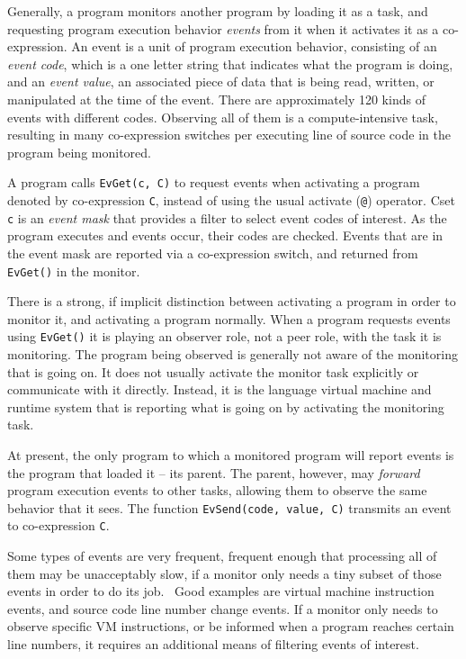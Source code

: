 Generally, a program monitors another program by loading it as a task,
and requesting program execution behavior \textit{events} from it when
it activates it as a co-expression. An event is a unit of program
execution behavior, consisting of an \textit{event code}, which is a
one letter string that indicates what the program is doing, and an
\textit{event value}, an associated piece of data that is being read,
written, or manipulated at the time of the event. There are
approximately 120 kinds of events with different codes. Observing all
of them is a compute-intensive task, resulting in many co-expression
switches per executing line of source code in the program being
monitored.

A program calls \texttt{EvGet(c, C)} to request events when activating a
program denoted by co-expression \texttt{C}, instead of using the usual
activate (\texttt{@}) operator. Cset \texttt{c} is an \textit{event
mask} that provides a filter to select event codes of interest. As
the program executes and events occur, their codes are checked.
Events that are in the event mask are reported via a co-expression switch,
and returned from \texttt{EvGet()} in the monitor.

There is a strong, if implicit distinction between activating a program
in order to monitor it, and activating a program normally. When a
program requests events using \texttt{EvGet()} it is playing an
observer role, not a peer role, with the task it is monitoring. The
program being observed is generally not aware of the monitoring that is
going on. It does not usually activate the monitor task explicitly or
communicate with it directly. Instead, it is the language virtual
machine and runtime system that is reporting what is going on by
activating the monitoring task.

At present, the only program to which a monitored program will report
events is the program that loaded it -- its parent. The parent,
however, may \textit{forward} program execution events to other tasks,
allowing them to observe the same behavior that it sees. The function
\texttt{EvSend(code, value, C)} transmits an event to co-expression
\texttt{C}.

Some types of events are very frequent, frequent enough that processing
all of them may be unacceptably slow, if a monitor only needs a tiny
subset of those events in order to do its job. \ Good examples are
virtual machine instruction events, and source code line number change
events. If a monitor only needs to observe specific VM instructions, or
be informed when a program reaches certain line numbers, it requires an
additional means of filtering events of interest.

